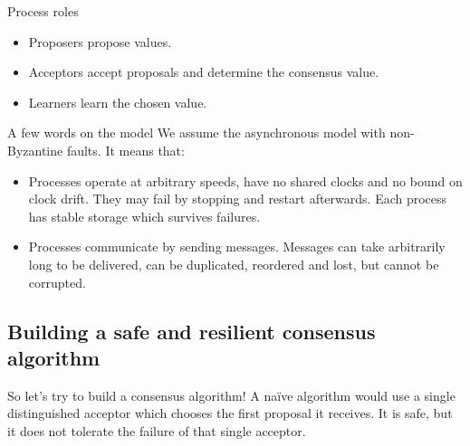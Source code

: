 \documentclass{beamer}
\begin{document}
\begin{frame}{Process roles}
  \begin{itemize}
    \item Proposers propose values.
    \item Acceptors accept proposals and determine the consensus value.
    \item Learners learn the chosen value.
  \end{itemize}
\end{frame}

\begin{frame}{A few words on the model}
  We assume the \alert{asynchronous} model with \alert{non-Byzantine} faults. It means that:
  \begin{itemize}
    \item Processes operate at arbitrary speeds, have no shared clocks and no bound on clock drift. They may fail by stopping and restart afterwards. Each process has stable storage which survives failures.
    \item Processes communicate by sending messages. Messages can take arbitrarily long to be delivered, can be duplicated, reordered and lost, but \alert{cannot be corrupted}.
  \end{itemize}
\end{frame}

\subsection{Building a safe and resilient consensus algorithm}
\begin{frame}{So let's try to build a consensus algorithm!}
  A na\"ive algorithm would use a single distinguished acceptor which chooses the first proposal it receives. It is safe, but it does not tolerate the failure of that single acceptor.
  \begin{figure}[!h]
  \centering
  \end{figure}
\end{frame}
\end{document}
